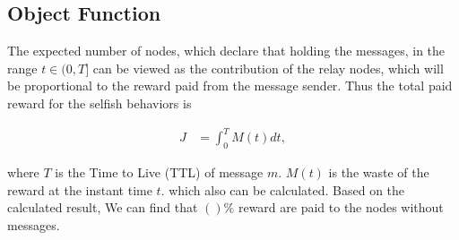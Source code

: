 \subsection{Object Function}
The expected number of nodes, which declare that holding the messages, in the range $t \in (0, T]$
can be viewed as the contribution of the relay nodes,
which will be proportional to the reward paid from the message sender.
Thus the total paid reward for the selfish behaviors is
\begin{small}
\begin{equation}
\nonumber
\begin{aligned}
J &= \int_{0}^{T} M(t) dt,
\end{aligned}
\end{equation}
\end{small}
where $T$ is the Time to Live (TTL) of message $m$.
$M(t)$ is the waste of the reward at the instant time $t$.
which also can be calculated.
Based on the calculated result,
We can find that $()\%$ reward are paid to the nodes without messages.

